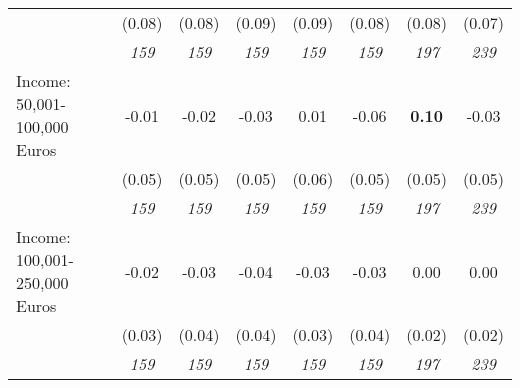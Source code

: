\begin{tabular}{l c c c c c c c}
& (0.08) & (0.08) & (0.09) & (0.09) & (0.08) & (0.08) & (0.07) \\
& \textit{ 159 } & \textit{ 159 } & \textit{ 159 } & \textit{ 159 } & \textit{ 159 } & \textit{ 197 } & \textit{ 239 } \\
Income: 50,001-100,000 Euros & -0.01 & -0.02 & -0.03 & 0.01 & -0.06 & \textbf{0.10} & -0.03 \\
& (0.05) & (0.05) & (0.05) & (0.06) & (0.05) & (0.05) & (0.05) \\
& \textit{ 159 } & \textit{ 159 } & \textit{ 159 } & \textit{ 159 } & \textit{ 159 } & \textit{ 197 } & \textit{ 239 } \\
Income: 100,001-250,000 Euros & -0.02 & -0.03 & -0.04 & -0.03 & -0.03 & 0.00 & 0.00 \\
& (0.03) & (0.04) & (0.04) & (0.03) & (0.04) & (0.02) & (0.02) \\
& \textit{ 159 } & \textit{ 159 } & \textit{ 159 } & \textit{ 159 } & \textit{ 159 } & \textit{ 197 } & \textit{ 239 } \\
\bottomrule
\end{tabular}
